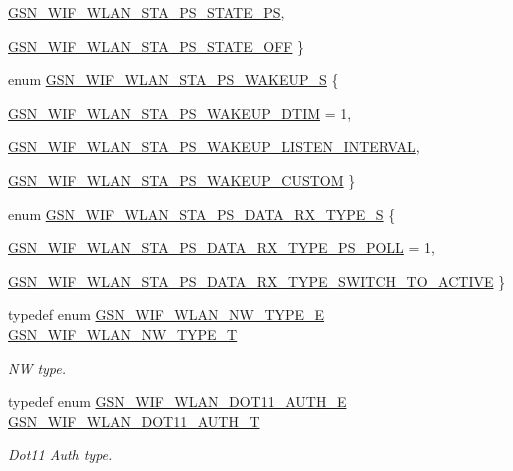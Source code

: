 \begin{DoxyCompactItemize}
\par
\hyperlink{a00677_gacdd46642c1bc32323d14e63794ffc1b3ad3cc5d691f757517adb594be62d9d1f2}{GSN\_\-WIF\_\-WLAN\_\-STA\_\-PS\_\-STATE\_\-PS}, 
\par
\hyperlink{a00677_gacdd46642c1bc32323d14e63794ffc1b3a499f7f6ba458ace7bf58b337f04691b1}{GSN\_\-WIF\_\-WLAN\_\-STA\_\-PS\_\-STATE\_\-OFF}
 \}
\item 
enum \hyperlink{a00677_ga37d0f17a3334d0645a337ca71c7c9bcb}{GSN\_\-WIF\_\-WLAN\_\-STA\_\-PS\_\-WAKEUP\_\-S} \{ \par
\hyperlink{a00677_ga37d0f17a3334d0645a337ca71c7c9bcbaa23860ccfc8a196b0548d18ca4ad6976}{GSN\_\-WIF\_\-WLAN\_\-STA\_\-PS\_\-WAKEUP\_\-DTIM} = 1, 
\par
\hyperlink{a00677_ga37d0f17a3334d0645a337ca71c7c9bcbaaa97fd2407d90cdf0a9f9ea24409c915}{GSN\_\-WIF\_\-WLAN\_\-STA\_\-PS\_\-WAKEUP\_\-LISTEN\_\-INTERVAL}, 
\par
\hyperlink{a00677_ga37d0f17a3334d0645a337ca71c7c9bcbaf9d18e3274cb9ca7a37a8d9f3e738bae}{GSN\_\-WIF\_\-WLAN\_\-STA\_\-PS\_\-WAKEUP\_\-CUSTOM}
 \}
\item 
enum \hyperlink{a00677_ga28466fa12055a0a4209a8280d845b52e}{GSN\_\-WIF\_\-WLAN\_\-STA\_\-PS\_\-DATA\_\-RX\_\-TYPE\_\-S} \{ \par
\hyperlink{a00677_ga28466fa12055a0a4209a8280d845b52ea006b93ce062cf46d6fa992aa49f68981}{GSN\_\-WIF\_\-WLAN\_\-STA\_\-PS\_\-DATA\_\-RX\_\-TYPE\_\-PS\_\-POLL} = 1, 
\par
\hyperlink{a00677_ga28466fa12055a0a4209a8280d845b52ea8c8d2cd41e7f515c06ea7867e9314250}{GSN\_\-WIF\_\-WLAN\_\-STA\_\-PS\_\-DATA\_\-RX\_\-TYPE\_\-SWITCH\_\-TO\_\-ACTIVE}
 \}
\item 
typedef enum \hyperlink{a00677_ga4d89b2a0c901a8c766f195897f16623f}{GSN\_\-WIF\_\-WLAN\_\-NW\_\-TYPE\_\-E} \hyperlink{a00677_gabc852e0cb262314c5f307a3e9802921e}{GSN\_\-WIF\_\-WLAN\_\-NW\_\-TYPE\_\-T}
\begin{DoxyCompactList}\small\item\em NW type. \end{DoxyCompactList}\item 
typedef enum \hyperlink{a00677_ga5415d31a2d60b731af07dc04240e540c}{GSN\_\-WIF\_\-WLAN\_\-DOT11\_\-AUTH\_\-E} \hyperlink{a00677_gaa550b3e9decb3a2585cb801dde9e5609}{GSN\_\-WIF\_\-WLAN\_\-DOT11\_\-AUTH\_\-T}
\begin{DoxyCompactList}\small\item\em Dot11 Auth type. \end{DoxyCompactList}\item 

\end{DoxyCompactItemize}
